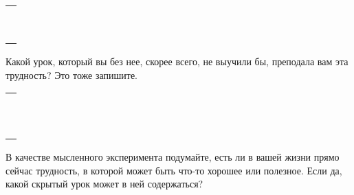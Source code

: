 \setlength{\extrarowheight}{2mm}
\begin{tabularx}{0.96\textwidth}{X}
	\\
	\arrayrulecolor{gray}\hline\\
	\hline\\
	\hline\\
	\hline\\
	\hline\\
	\hline\\	
	\hline\\
	\hline\\
	\hline\\
	\hline\\
\end{tabularx}
\setlength{\extrarowheight}{0mm}
\begin{itemize}
	\itemWritingHand Какой урок, который вы без нее, скорее всего, не выучили бы, преподала вам эта трудность? Это тоже запишите.
\end{itemize}

\setlength{\extrarowheight}{2mm}
\begin{tabularx}{0.96\textwidth}{X}
	\\
	\arrayrulecolor{gray}\hline\\
	\hline\\
	\hline\\
	\hline\\
	\hline\\
	\hline\\	
	\hline\\
	\hline\\
	\hline\\
	\hline\\
	\hline\\
	\hline\\
\end{tabularx}
\setlength{\extrarowheight}{0mm}
\begin{itemize}
	\itemWritingHand В качестве мысленного эксперимента подумайте, есть ли в вашей жизни  прямо сейчас трудность, в которой может быть что-то хорошее или полезное. Если да, какой скрытый урок может в ней содержаться?
\end{itemize}

